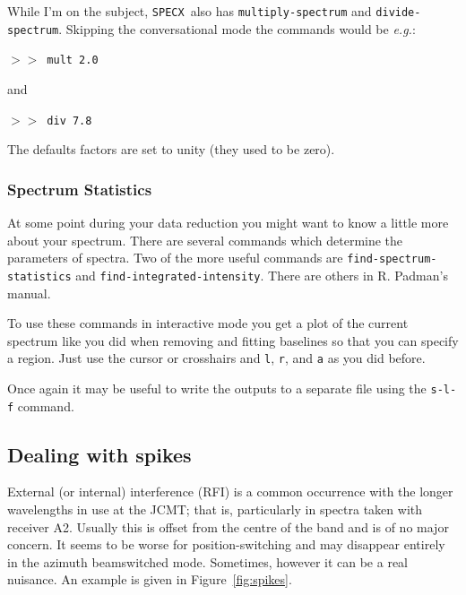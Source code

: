 \documentclass[11pt,twoside]{starlink}
\providecommand{\eg}{\textit{e.g.}}
\providecommand{\SPECX}{\texttt{SPECX}}
\providecommand{\SP}{{$>\!>$}}
\begin{document}
While I'm on the subject, \SPECX\ also has \texttt{multiply-spectrum} and
\texttt{divide-spectrum}.  Skipping the conversational mode the commands
would be \eg :

\SP\ \verb|mult 2.0|

and

\SP\ \verb|div 7.8|

The defaults factors are set to unity (they used to be zero).

\subsubsection{Spectrum Statistics}
\label{sec:specx_10}
At some point during your data reduction you might want to know a little more
about your spectrum.  There are several commands which determine the
parameters of spectra.  Two of the more useful commands are \texttt{find-spectrum-statistics} and \texttt{find-integrated-intensity}.  There are
others in R. Padman's manual.

To use these commands in interactive mode you get a plot of the
current spectrum like you did when removing and fitting baselines so
that you can specify a region.  Just use the cursor or crosshairs and
\texttt{l}, \texttt{r}, and \texttt{a} as you did before.

Once again it may be useful to write the outputs to a separate file
using the \texttt{s-l-f} command.

\subsection{Dealing with spikes}
\label{sec:spike-removal}
External (or internal) interference (RFI) is a common occurrence with
the longer wavelengths in use at the JCMT; that is, particularly in
spectra taken with receiver A2. Usually this is offset from the centre
of the band and is of no major concern. It seems to be worse for
position-switching and may disappear entirely in the azimuth
beamswitched mode. Sometimes, however it can be a real nuisance. An
example is given in Figure~\ref{fig:spikes}.
\end{document}
